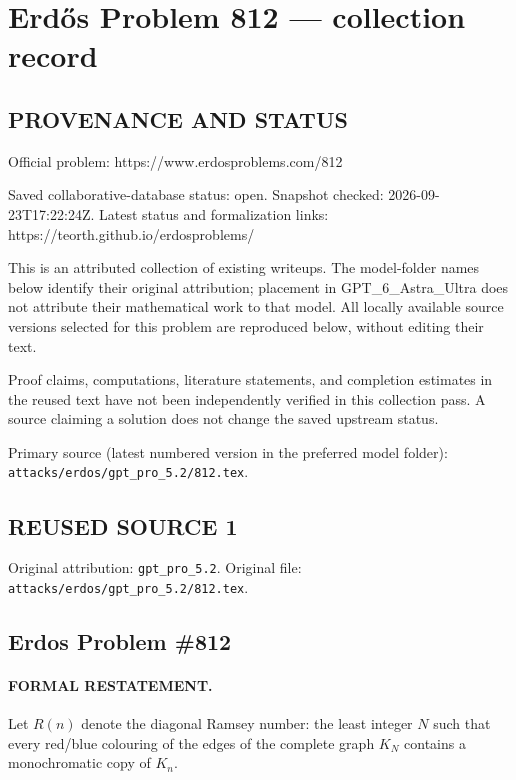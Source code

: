 \section*{Erd\H{o}s Problem 812 --- collection record}

\subsection*{PROVENANCE AND STATUS}
Official problem: https://www.erdosproblems.com/812

Saved collaborative-database status: open.
Snapshot checked: 2026-09-23T17:22:24Z.
Latest status and formalization links: https://teorth.github.io/erdosproblems/

This is an attributed collection of existing writeups. The model-folder names below identify their original attribution; placement in GPT\_6\_Astra\_Ultra does not attribute their mathematical work to that model. All locally available source versions selected for this problem are reproduced below, without editing their text.

Proof claims, computations, literature statements, and completion estimates in the reused text have not been independently verified in this collection pass. A source claiming a solution does not change the saved upstream status.

Primary source (latest numbered version in the preferred model folder): \texttt{attacks/erdos/gpt\_pro\_5.2/812.tex}.

\subsection*{REUSED SOURCE 1}
Original attribution: \texttt{gpt\_pro\_5.2}.
Original file: \texttt{attacks/erdos/gpt\_pro\_5.2/812.tex}.


\subsection*{Erdos Problem \#812}

\paragraph{FORMAL RESTATEMENT.}
Let $R(n)$ denote the diagonal Ramsey number: the least integer $N$ such that every red/blue colouring of the edges of the complete graph $K_N$ contains a monochromatic copy of $K_n$.

